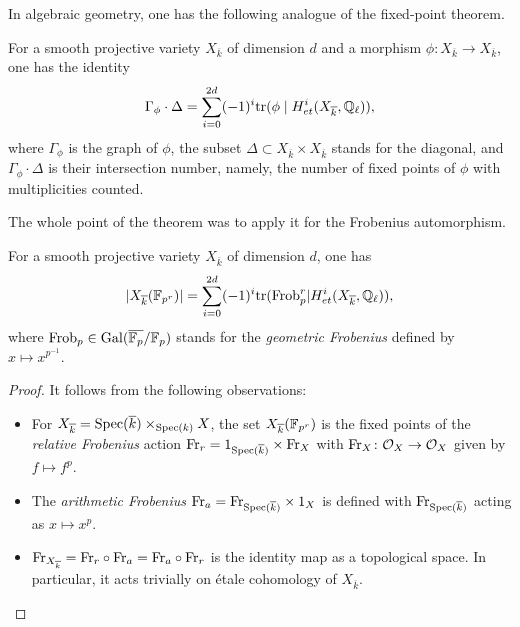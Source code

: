 In algebraic geometry, one has the following analogue of the fixed-point theorem.

\begin{theorem}
For a smooth projective variety $X_{\overline{k}}$ of dimension $d$ and a morphism $ \phi \colon X_{\overline{k}} \rightarrow X_{\overline{k}}$, one has the identity \[
\Gamma_\phi \cdot \Delta = \displaystyle\sum_{i = 0 }^{2d } (-1)^i \mathrm{tr }( \phi \mid H^i_{et}(X_{\overline{k}},\mathbb{Q}_\ell) ),
\]
where $\Gamma_\phi$ is the graph of $\phi$, the subset $\Delta \subset X_{\overline{k}} \times X_{\overline{k}}$ stands for the diagonal, and $\Gamma_\phi \cdot \Delta$ is their intersection number, namely, the number of fixed points of $\phi$ with multiplicities counted. 
\end{theorem}

The whole point of the theorem was to apply it for the Frobenius automorphism.

\begin{corollary}
For a smooth projective variety $X_{\overline{k}}$ of dimension $d$, one has \[|X_{\overline{k}}(\mathbb{F}_{p^r})| = \displaystyle\sum_{i = 0 }^{2d }  (-1)^i \mathrm{tr}(\mathrm{Frob}_p^r|H^i_{et}(X_{\overline{k} } , \mathbb{Q}_\ell ) ),\] where $\mathrm{Frob}_p \in \mathrm{Gal}(\overline{\mathbb{F}_p} / \mathbb{F}_p )$ stands for the \textit{geometric Frobenius} defined by $x \mapsto x^{p^{-1}}$.
\end{corollary}

\begin{proof}
It follows from the following observations:
\begin{itemize}
\item For $X_{\overline{k}} = \mathrm{Spec}(\overline{k}) \times_{\mathrm{Spec}(k)} X$, the set $X_{\overline{k}} (\mathbb{F}_{p^r})$ is the fixed points of the \textit{relative Frobenius} action $\mathrm{Fr}_r = 1_{\mathrm{Spec}(\overline{k}) } \times \mathrm{Fr}_X $ with $\mathrm{Fr}_X \colon \mathcal{O}_X \rightarrow \mathcal{O}_X$ given by $f \mapsto f^p$.
\item The \textit{arithmetic Frobenius} $\mathrm{Fr}_a = \mathrm{Fr}_{\mathrm{Spec}(\overline{k}) } \times 1_X$ is defined with $\mathrm{Fr}_{\mathrm{Spec}(\overline{k}) }$ acting as $x \mapsto x^p$.
\item $\mathrm{Fr}_{X_{\overline{k}}}= \mathrm{Fr}_r \circ \mathrm{Fr}_a = \mathrm{Fr}_a \circ \mathrm{Fr}_r$ is the identity map as a topological space. In particular, it acts trivially on \'etale cohomology of $X_{\overline{k}}$.
\end{itemize}
\end{proof}


